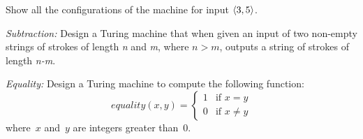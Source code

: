 \documentclass[../../include/open-logic-section]{subfiles}
\begin{document}
\begin{prob}
Show all the configurations of the machine for input $\langle 3,5 \rangle$.
\end{prob}

\begin{prob}
\emph{Subtraction:} Design a Turing machine that when given an input of two non-empty 
strings of strokes of length \emph{n} and \emph{m}, where $n > m$, outputs a string of 
strokes of length \emph{n-m}. 
\end{prob}

\begin{prob}
\emph{Equality:} Design a Turing machine to compute the following function:
\[
equality(x,y) = 
\begin{cases}
  \text{1} & \text{if~$x = y$} \\
  \text{0} & \text{if~$x \neq y$}
\end{cases}
\]
where~$x$ and~$y$ are integers greater than~$0$.
\end{prob}
\end{document}

